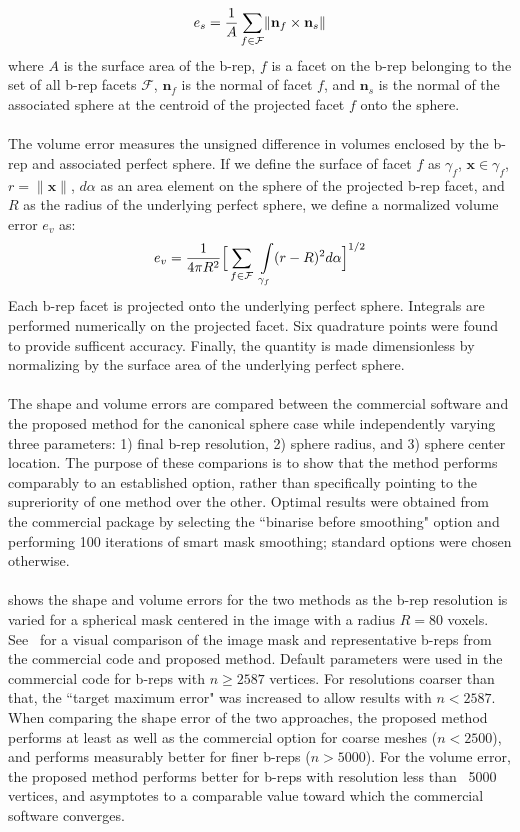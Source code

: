 \begin{equation} 
	e_s = \frac{1}{A} \sum \limits_{f\in\mathcal{F}} \lVert {\bf n}_f \times {\bf n}_s \rVert
\end{equation}
where $A$ is the surface area of the b-rep, $f$ is a facet on the b-rep belonging to the set of all b-rep facets $\mathcal{F}$, ${\bm n}_f$ is the normal of facet $f$, and ${\bm n}_s$ is the normal of the associated sphere at the centroid of the projected facet $f$ onto the sphere. \\ \\
%
The volume error measures the unsigned difference in volumes enclosed by the b-rep and associated perfect sphere. If we define the surface of facet $f$ as $\gamma_f$,  ${\bm x} \in \gamma_f$, $r = \lVert {\bm x} \rVert$, $d\alpha$ as an area element on the sphere of the projected b-rep facet, and $R$ as the radius of the underlying perfect sphere, we define a normalized volume error $e_v$ as:
\begin{equation}
	e_v = \frac{1}{4\pi R^2} \Big[\sum \limits_{f \in \mathcal{F}\textsl{}} \ \int \limits_{\gamma_f} (r - R)^2 d\alpha \Big]^{1/2}
\end{equation}
Each b-rep facet is projected onto the underlying perfect sphere. Integrals are performed numerically on the projected facet. Six quadrature points were found to provide sufficent accuracy. Finally, the quantity is made dimensionless by normalizing by the surface area of the underlying perfect sphere.
\\ \\
%
The shape and volume errors are compared between the commercial software and the proposed method for the canonical sphere case while independently varying three parameters: 1) final b-rep resolution, 2) sphere radius, and 3) sphere center location. The purpose of these comparions is to show that the  method performs comparably to an established option, rather than specifically pointing to the supreriority of one method over the other. Optimal results were obtained from the commercial package by selecting the ``binarise before smoothing" option and performing 100 iterations of smart mask smoothing; standard options were chosen otherwise. \\ \\
%
 shows the shape and volume errors for the two methods as the b-rep resolution is varied for a spherical mask centered in the image with a radius $R = 80$ voxels. See~ for a visual comparison of the image mask and representative b-reps from the commercial code and proposed method. Default parameters were used in the commercial code for b-reps with $n \ge 2587$ vertices. For resolutions coarser than that, the ``target maximum error" was increased to allow results with $n < 2587$. When comparing the shape error of the two approaches, the proposed method performs at least as well as the commercial option for coarse meshes ($n < 2500$), and performs measurably better for finer b-reps ($n > 5000$). For the volume error, the proposed method performs better for b-reps with resolution less than ~5000 vertices, and asymptotes to a comparable value toward which the commercial software converges.\\ \\

